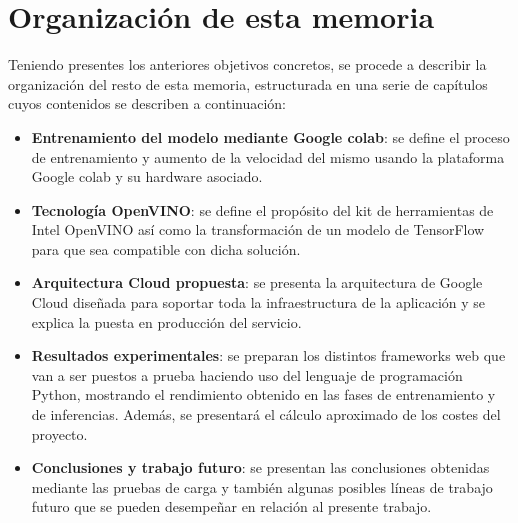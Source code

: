 \section{Organización de esta memoria}\label{sec:organización-de-esta-memoria}

Teniendo presentes los anteriores objetivos concretos, se procede a describir la organización del resto de esta memoria, estructurada en una serie de capítulos cuyos contenidos se
describen a continuación:

\begin{itemize}
    \item \textbf{Entrenamiento del modelo mediante Google colab}: se define el proceso de entrenamiento y aumento de la velocidad del mismo usando la plataforma Google colab y su hardware asociado.
    \item \textbf{Tecnología OpenVINO}: se define el propósito del kit de herramientas de Intel OpenVINO así como la transformación de un modelo de TensorFlow para que sea compatible con dicha solución.
    \item \textbf{Arquitectura Cloud propuesta}: se presenta la arquitectura de Google Cloud diseñada para soportar toda la infraestructura de la aplicación y se explica la puesta en producción del servicio.
    \item \textbf{Resultados experimentales}: se preparan los distintos frameworks web que van a ser puestos a prueba haciendo uso del lenguaje de programación Python, mostrando el rendimiento obtenido en las fases de entrenamiento y de inferencias. Además, se presentará el cálculo aproximado de los costes del proyecto.
    \item \textbf{Conclusiones y trabajo futuro}: se presentan las conclusiones obtenidas mediante las pruebas de carga y también algunas posibles líneas de trabajo futuro que se pueden desempeñar en relación al presente trabajo.
\end{itemize}